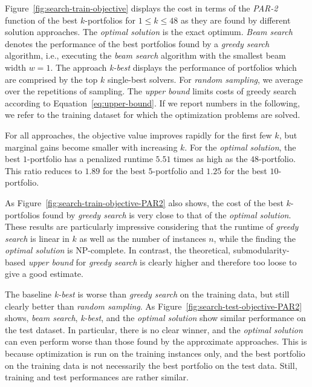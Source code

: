 \documentclass[conference]{IEEEtran}
\begin{document}
Figure~\ref{fig:search-train-objective} displays the cost in terms of the \emph{PAR-2} function of the best $k$-portfolios for $1 \leq k \leq 48$ as they are found by different solution approaches. 
The \emph{optimal solution} is the exact optimum.
\emph{Beam search} denotes the performance of the best portfolios found by a \emph{greedy search} algorithm, i.e., executing the \emph{beam search} algorithm with the smallest beam width $w=1$. 
The approach \emph{k-best} displays the performance of portfolios which are comprised by the top $k$ single-best solvers. 
For \emph{random sampling}, we average over the repetitions of sampling.
The \emph{upper bound} limits costs of {greedy search} according to Equation~\ref{eq:upper-bound}.
If we report numbers in the following, we refer to the training dataset for which the optimization problems are solved.

For all approaches, the objective value improves rapidly for the first few $k$, but marginal gains become smaller with increasing $k$.
For the \emph{optimal solution}, the best $1$-portfolio has a penalized runtime $5.51$ times as high as the $48$-portfolio. 
This ratio reduces to $1.89$ for the best $5$-portfolio and $1.25$ for the best $10$-portfolio. 

As Figure~\ref{fig:search-train-objective-PAR2} also shows, the cost of the best $k$-portfolios found by \emph{greedy search} is very close to that of the \emph{optimal solution}.
These results are particularly impressive considering that the runtime of \emph{greedy search} is linear in $k$ as well as the number of instances $n$, while the finding the \emph{optimal solution} is NP-complete.
In contrast, the theoretical, submodularity-based \emph{upper bound} for \emph{greedy search} is clearly higher and therefore too loose to give a good estimate. 

The baseline \emph{k-best} is worse than \emph{greedy search} on the training data, but still clearly better than \emph{random sampling}.
As Figure~\ref{fig:search-test-objective-PAR2} shows, \emph{beam search}, \emph{k-best}, and the \emph{optimal solution} show similar performance on the test dataset.
In particular, there is no clear winner, and the \emph{optimal solution} can even perform worse than those found by the approximate approaches. 
This is because optimization is run on the training instances only, and the best portfolio on the training data is not necessarily the best portfolio on the test data.
Still, training and test performances are rather similar.
\end{document}
